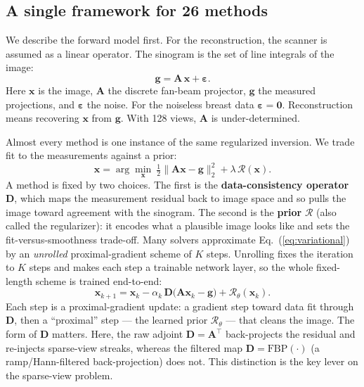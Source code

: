 \documentclass[AMA,twocolumn]{USG} %
\begin{document}
\subsection{A single framework for 26 methods}\label{sec:framework}

We describe the forward model first. For the reconstruction, the scanner is assumed as a linear operator. The sinogram is the set of line integrals of the image:
\begin{equation}\label{eq:forward}
\mathbf{g} = \mathbf{A}\,\mathbf{x} + \boldsymbol{\varepsilon}.
\end{equation}
Here $\mathbf{x}$ is the image, $\mathbf{A}$ the discrete fan-beam projector, $\mathbf{g}$ the measured projections, and $\boldsymbol{\varepsilon}$ the noise. For the noiseless breast data $\boldsymbol{\varepsilon}=\mathbf{0}$. Reconstruction means recovering $\mathbf{x}$ from $\mathbf{g}$. With 128 views, $\mathbf{A}$ is under-determined.

Almost every method is one instance of the same regularized inversion. We trade fit to the measurements against a prior:
\begin{equation}\label{eq:variational}
\hat{\mathbf{x}}=\arg\min_{\mathbf{x}}\ \tfrac12\|\mathbf{A}\mathbf{x}-\mathbf{g}\|_2^2+\lambda\,\mathcal{R}(\mathbf{x}).
\end{equation}
A method is fixed by two choices. The first is the \textbf{data-consistency operator} $\mathbf{D}$, which maps the measurement residual back to image space and so pulls the image toward agreement with the sinogram. The second is the \textbf{prior} $\mathcal{R}$ (also called the regularizer): it encodes what a plausible image looks like and sets the fit-versus-smoothness trade-off. Many solvers approximate Eq.~(\ref{eq:variational}) by an \emph{unrolled} proximal-gradient scheme of $K$ steps. Unrolling fixes the iteration to $K$ steps and makes each step a trainable network layer, so the whole fixed-length scheme is trained end-to-end:
\begin{equation}\label{eq:unroll}
\mathbf{x}_{k+1} = \mathbf{x}_k - \alpha_k\,\mathbf{D}\big(\mathbf{A}\mathbf{x}_k-\mathbf{g}\big) + \mathcal{R}_\theta(\mathbf{x}_k).
\end{equation}
Each step is a proximal-gradient update: a gradient step toward data fit through $\mathbf{D}$, then a ``proximal'' step --- the learned prior $\mathcal{R}_\theta$ --- that cleans the image. The form of $\mathbf{D}$ matters. Here, the raw adjoint $\mathbf{D}=\mathbf{A}^{\!\top}$ back-projects the residual and re-injects sparse-view streaks, whereas the filtered map $\mathbf{D}=\mathrm{FBP}(\cdot)$ (a ramp/Hann-filtered back-projection) does not. This distinction is the key lever on the sparse-view problem.
\end{document}

